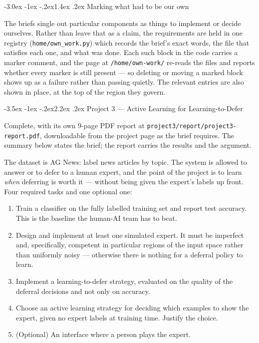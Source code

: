 \documentclass[11pt,a4paper]{article}
\makeatletter
\renewcommand\section{\@startsection{section}{1}{\z@}%
  {-3.5ex \@plus -1ex \@minus -.2ex}{2.2ex \@plus.2ex}%
  {\normalfont\Large\sffamily\bfseries\color{accent}}}
\renewcommand\subsection{\@startsection{subsection}{2}{\z@}%
  {-3.0ex \@plus -1ex \@minus -.2ex}{1.4ex \@plus .2ex}%
  {\normalfont\large\sffamily\bfseries\color{accent}}}
\newcommand{\file}[1]{\texttt{\small #1}}
\makeatother
\begin{document}
\subsection{Marking what had to be our own}

The briefs single out particular components as things to implement or decide
ourselves. Rather than leave that as a claim, the requirements are held in one
registry (\file{home/own\_work.py}) which records the brief's exact words, the
file that satisfies each one, and what was done. Each such block in the code
carries a marker comment, and the page at \file{/home/own-work/} re-reads the
files and reports whether every marker is still present --- so deleting or moving
a marked block shows up as a failure rather than passing quietly. The relevant
entries are also shown in place, at the top of the region they govern.


\section{Project 3 --- Active Learning for Learning-to-Defer}

Complete, with its own 9-page PDF report at
\file{project3/report/project3-report.pdf}, downloadable from the project page as
the brief requires. The summary below states the brief; the report carries the
results and the argument.

The dataset is AG News: label news articles by topic. The system is allowed to
answer or to defer to a human expert, and the point of the project is to learn
\emph{when} deferring is worth it --- without being given the expert's labels up
front. Four required tasks and one optional one:

\begin{enumerate}
\item Train a classifier on the fully labelled training set and report test
accuracy. This is the baseline the human-AI team has to beat.

\item Design and implement at least one simulated expert. It must be imperfect
and, specifically, competent in particular regions of the input space rather than
uniformly noisy --- otherwise there is nothing for a deferral policy to learn.

\item Implement a learning-to-defer strategy, evaluated on the quality of the
deferral decisions and not only on accuracy.

\item Choose an active learning strategy for deciding which examples to show the
expert, given no expert labels at training time. Justify the choice.

\item (Optional) An interface where a person plays the expert.
\end{enumerate}
\end{document}
